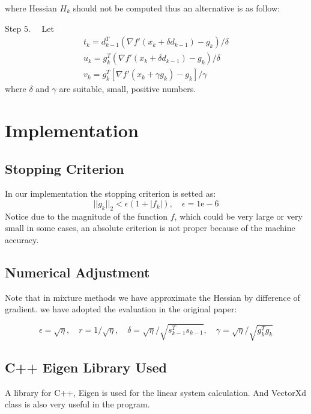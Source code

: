 \documentclass{article}
\begin{document}
where Hessian $H_k$ should not be computed thus an alternative is as follow: 

Step $5 . \quad$ Let
\[
\begin{array}{l}
t_{k}=d_{k-1}^{T}\left(\nabla f{\prime}\left(x_{k}+\delta d_{k-1}\right)-g_{k}\right) / \delta \\
u_{k}=g_{k}^{T}\left(\nabla f{\prime}\left(x_{k}+\delta d_{k-1}\right)-g_{k}\right) / \delta \\
v_{k}=g_{k}^{T}\left[\nabla f{\prime}\left(x_{k}+\gamma g_{k}\right)-g_{k}\right] / \gamma
\end{array}
\]
where $\delta$ and $\gamma$ are suitable, small, positive numbers.



\section{Implementation}
\subsection{Stopping Criterion}
In our implementation the stopping criterion is setted as:
\begin{equation}
||g_k||_2 < \epsilon (1 + |f_k|),\quad \epsilon = 1\mathrm{e}-6
\end{equation}
Notice due to the magnitude of the function $f$, which could be very large or very small in some cases, an absolute criterion is not proper because of the machine accuracy.

\subsection{Numerical Adjustment}
Note that in mixture methods we have approximate the Hessian by difference of gradient. we have adopted the evaluation in the original paper:

\begin{equation}
\epsilon=\sqrt{\eta}, \quad r=1 / \sqrt{\eta}, \quad \delta=\sqrt{\eta} / \sqrt{s_{k-1}^{T} s_{k-1}}, \quad \gamma=\sqrt{\eta} / \sqrt{g_{k}^{T} g_{k}}
\end{equation}

\subsection{C++ Eigen Library Used}
A library for C++, Eigen is used for the linear system calculation. And VectorXd class is also very useful in the program.
\end{document}
